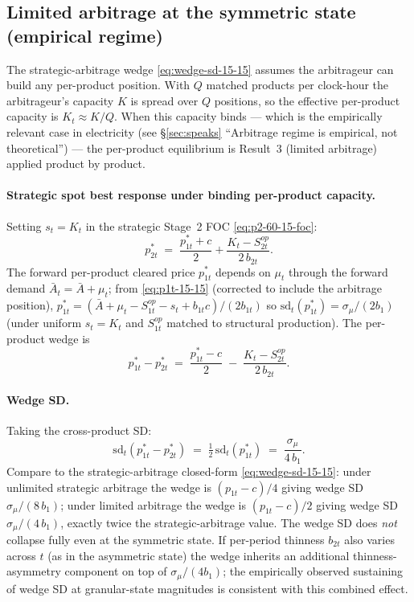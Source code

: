 \documentclass[11pt]{article}
\begin{document}
\subsection{Limited arbitrage at the symmetric state (empirical regime)}\label{app:15-15:limited}

The strategic-arbitrage wedge \eqref{eq:wedge-sd-15-15} assumes the arbitrageur can build any per-product position. With $Q$ matched products per clock-hour the arbitrageur's capacity $K$ is spread over $Q$ positions, so the effective per-product capacity is $K_t \approx K/Q$. When this capacity binds --- which is the empirically relevant case in electricity (see \S\ref{sec:speaks} ``Arbitrage regime is empirical, not theoretical'') --- the per-product equilibrium is \citeauthor{ito_reguant_2016} Result~3 (limited arbitrage) applied product by product.

\paragraph{Strategic spot best response under binding per-product capacity.} Setting $s_t = K_t$ in the strategic Stage~2 FOC \eqref{eq:p2-60-15-foc}:
\[
p_{2t}^* \;=\; \frac{p_{1t}^* + c}{2} + \frac{K_t - S^{op}_{2t}}{2\, b_{2t}}.
\]
The forward per-product cleared price $p_{1t}^*$ depends on $\mu_t$ through the forward demand $\bar A_t = \bar A + \mu_t$; from \eqref{eq:p1t-15-15} (corrected to include the arbitrage position), $p_{1t}^* = (\bar A + \mu_t - S^{op}_{1t} - s_t + b_{1t} c)/(2 b_{1t})$ so $\mathrm{sd}_t(p_{1t}^*) = \sigma_\mu/(2 b_1)$ (under uniform $s_t = K_t$ and $S^{op}_{1t}$ matched to structural production). The per-product wedge is
\[
p_{1t}^* - p_{2t}^* \;=\; \frac{p_{1t}^* - c}{2} \;-\; \frac{K_t - S^{op}_{2t}}{2\, b_{2t}}.
\]

\paragraph{Wedge SD.} Taking the cross-product SD:
\[
\mathrm{sd}_t(p_{1t}^* - p_{2t}^*) \;=\; \tfrac{1}{2}\,\mathrm{sd}_t(p_{1t}^*) \;=\; \frac{\sigma_\mu}{4\, b_1}.
\]
Compare to the strategic-arbitrage closed-form \eqref{eq:wedge-sd-15-15}: under unlimited strategic arbitrage the wedge is $(p_{1t}-c)/4$ giving wedge SD $\sigma_\mu/(8\, b_1)$; under limited arbitrage the wedge is $(p_{1t}-c)/2$ giving wedge SD $\sigma_\mu/(4\, b_1)$, exactly twice the strategic-arbitrage value. The wedge SD does \emph{not} collapse fully even at the symmetric state. If per-period thinness $b_{2t}$ also varies across $t$ (as in the asymmetric state) the wedge inherits an additional thinness-asymmetry component on top of $\sigma_\mu/(4 b_1)$; the empirically observed sustaining of wedge SD at granular-state magnitudes is consistent with this combined effect.
\end{document}
